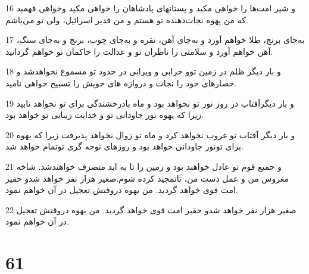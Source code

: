 \par 16 و شیر امت‌ها را خواهی مکید و پستانهای پادشاهان را خواهی مکید وخواهی فهمید که من یهوه نجات‌دهنده تو هستم و من قدیر اسرائیل، ولی تو می‌باشم.
\par 17 به‌جای برنج، طلا خواهم آورد و به‌جای آهن، نقره و به‌جای چوب، برنج و به‌جای سنگ، آهن خواهم آورد و سلامتی را ناظران تو و عدالت را حاکمان تو خواهم گردانید.
\par 18 و بار دیگر ظلم در زمین توو خرابی و ویرانی در حدود تو مسموع نخواهدشد و حصارهای خود را نجات و دروازه های خویش را تسبیح خواهی نامید.
\par 19 و بار دیگرآفتاب در روز نور تو نخواهد بود و ماه بادرخشندگی برای تو نخواهد تابید زیرا که یهوه نور جاودانی تو و خدایت زیبایی تو خواهد بود.
\par 20 و بار دیگر آفتاب تو غروب نخواهد کرد و ماه تو زوال نخواهد پذیرفت زیرا که یهوه برای تونور جاودانی خواهد بود و روزهای نوحه گری توتمام خواهد شد.
\par 21 و جمیع قوم تو عادل خواهند بود و زمین را تا به ابد متصرف خواهندشد. شاخه مغروس من و عمل دست من، تاتمجید کرده شوم.صغیر هزار نفر خواهد شدو حقیر امت قوی خواهد گردید. من یهوه دروقتش تعجیل در آن خواهم نمود.
\par 22 صغیر هزار نفر خواهد شدو حقیر امت قوی خواهد گردید. من یهوه دروقتش تعجیل در آن خواهم نمود.
 
\chapter{61}

